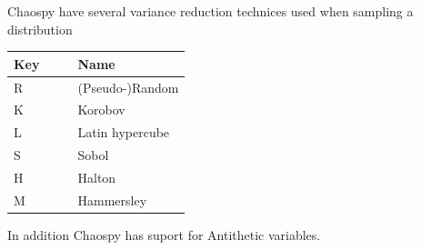 \documentclass[handout]{beamer}
\begin{document}
%



\begin{frame}{Chaospy have several variance reduction technices used when sampling a distribution}
\begin{center}{
\def\arraystretch{1.2}
  \begin{tabular}{llll}
   Key & & &  Name            \\\hline
     R & & &  (Pseudo-)Random   \\\hline
     \pause
     K & & &  Korobov            \\
     L & & &  Latin hypercube    \\
     S & & &  Sobol              \\
     H & & &  Halton             \\
     M & & &  Hammersley        \\\hline
  \end{tabular}
}
\end{center}
\pause
In addition Chaospy has suport for Antithetic variables.

\end{frame}
\end{document}
